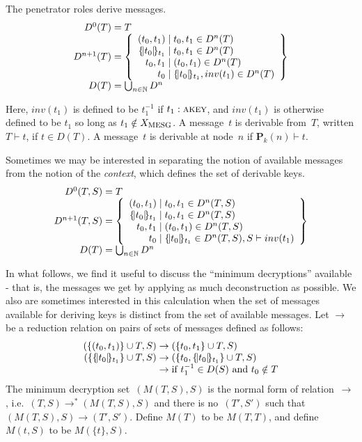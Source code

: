 \documentclass[12pt]{article}
\theoremstyle{definition}
\newcommand{\scap}[1]{\ensuremath{\mathop{\relax
                    \smash{\mbox{\sc#1}}}\!\mathop{\vphantom{#1}}\nolimits}}
\newcommand{\pubmsg}{\mathbf{P}}
\begin{document}
The penetrator roles derive messages.
$$\begin{array}{r@{{}={}}l}
D^0(T)&T\\
D^{n+1}(T)&\left\{\begin{array}{r@{{}\mid{}}l}
(t_0,t_1)&t_0,t_1\in D^n(T)\\
\enc{t_0}{t_1}&t_0,t_1\in D^n(T)\\
t_0,t_1 &(t_0,t_1) \in D^n(T)\\
t_0 & \enc{t_0}{t_1}, inv(t_1) \in D^n(T)
\end{array}\right\}\\
D(T)&\bigcup_{n\in\nat}D^n
\end{array}$$

Here, $inv(t_1)$ is defined to be $t_1^{-1}$ if $t_1 : \scap{akey}$, and
$inv(t_1)$ is otherwise defined to be $t_1$ so long as $t_1 \notin X_{\scap{mesg}}$.
A message~$t$ is derivable from~$T$, written $T\vdash t$, if $t\in D(T)$.
A message~$t$ is derivable at node~$n$ if $\pubmsg_k(n)\vdash t$.

Sometimes we may be interested in separating the notion of available messages
from the notion of the \emph{context}, which defines the set of derivable keys.
$$\begin{array}{r@{{}={}}l}
D^0(T,S)&T\\
D^{n+1}(T,S)&\left\{\begin{array}{r@{{}\mid{}}l}
(t_0,t_1)&t_0,t_1\in D^n(T,S)\\
\enc{t_0}{t_1}&t_0,t_1\in D^n(T,S)\\
t_0,t_1 &(t_0,t_1) \in D^n(T,S)\\
t_0 & \enc{t_0}{t_1} \in D^n(T,S), S \vdash inv(t_1)
\end{array}\right\}\\
D(T)&\bigcup_{n\in\nat}D^n
\end{array}$$

In what follows, we find it useful to discuss the ``minimum decryptions''
available - that is, the messages we get by applying as much deconstruction as 
possible.  We also are sometimes interested in this calculation when the set
of messages available for deriving keys is distinct from the set of available
messages.  Let $\to$ be a reduction relation on pairs of sets of messages defined 
as follows:
$$\begin{array}{r@{{}\to{}}ll}
(\{(t_0,t_1)\}\cup T, S)&(\{t_0,t_1\}\cup T, S)\\
(\{\enc{t_0}{t_1}\}\cup T, S)&(\{t_0,\enc{t_0}{t_1}\}\cup T, S)\\
&\mbox{if $t_1^{-1}\in D(S)$ and $t_0\notin T$}
\end{array}$$
The minimum decryption set~$(M(T,S),S)$ is the normal form of relation~$\to$,
i.e.\ $(T,S)\to^\ast (M(T,S),S)$ and there is no~$(T',S')$ such that $(M(T,S),S)\to(T',S')$.
Define $M(T)$ to be $M(T,T)$, and define $M(t,S)$ to be $M(\{t\},S)$.  
\end{document}
